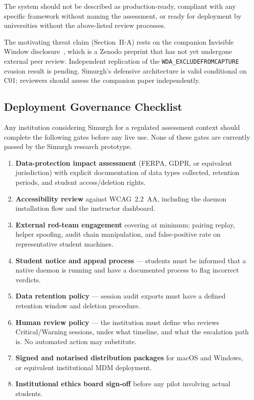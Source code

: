 \documentclass[conference]{IEEEtran}
\begin{document}
The system should not be described as production-ready, compliant with any specific framework without naming the assessment, or ready for deployment by universities without the above-listed review processes.

The motivating threat claim (Section~II-A) rests on the companion Invisible Window disclosure~\cite{abedini2026invisible}, which is a Zenodo preprint that has not yet undergone external peer review. Independent replication of the \texttt{WDA\_EXCLUDEFROMCAPTURE} evasion result is pending. Simurgh's defensive architecture is valid conditional on C01; reviewers should assess the companion paper independently.

\subsection{Deployment Governance Checklist}

Any institution considering Simurgh for a regulated assessment context should complete the following gates before any live use. None of these gates are currently passed by the Simurgh research prototype.

\begin{enumerate}
\item \textbf{Data-protection impact assessment} (FERPA, GDPR, or equivalent jurisdiction) with explicit documentation of data types collected, retention periods, and student access/deletion rights.
\item \textbf{Accessibility review} against WCAG~2.2~AA, including the daemon installation flow and the instructor dashboard.
\item \textbf{External red-team engagement} covering at minimum: pairing replay, helper spoofing, audit chain manipulation, and false-positive rate on representative student machines.
\item \textbf{Student notice and appeal process} — students must be informed that a native daemon is running and have a documented process to flag incorrect verdicts.
\item \textbf{Data retention policy} — session audit exports must have a defined retention window and deletion procedure.
\item \textbf{Human review policy} — the institution must define who reviews Critical/Warning sessions, under what timeline, and what the escalation path is. No automated action may substitute.
\item \textbf{Signed and notarised distribution packages} for macOS and Windows, or equivalent institutional MDM deployment.
\item \textbf{Institutional ethics board sign-off} before any pilot involving actual students.
\end{enumerate}
\end{document}
